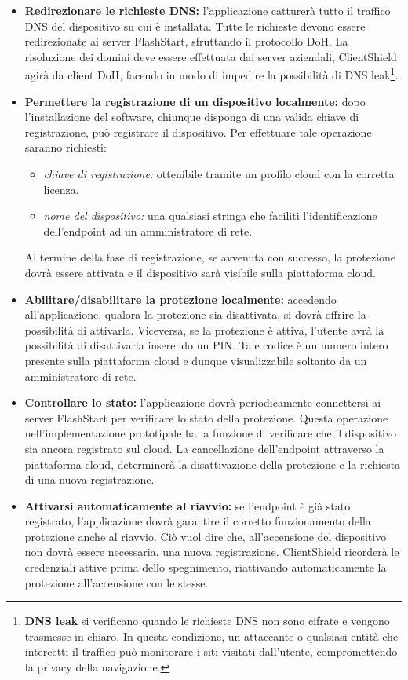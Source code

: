 \documentclass[12pt,a4paper,openright,twoside]{book}
\begin{document}
\begin{itemize}
	\item \textbf{Redirezionare le richieste \gls{DNS}:}
	l'applicazione catturerà tutto il traffico \gls{DNS} del dispositivo su cui è installata.
	Tutte le richieste devono essere redirezionate ai server FlashStart, sfruttando il protocollo \gls{DoH}.
	La risoluzione dei domini deve essere effettuata dai server aziendali, ClientShield agirà da client \gls{DoH}, facendo in modo di impedire la possibilità di \gls{DNS} leak\footnote{\textbf{DNS leak} si verificano quando le richieste \gls{DNS} non sono cifrate e vengono trasmesse in chiaro.  
		In questa condizione, un attaccante o qualsiasi entità che intercetti il traffico può monitorare i siti visitati dall'utente, compromettendo la privacy della navigazione.}.

	
	\item \textbf{Permettere la registrazione di un dispositivo localmente:}
	dopo l'installazione del software, chiunque disponga di una valida chiave di registrazione, può registrare il dispositivo.
	Per effettuare tale operazione saranno richiesti:
	\begin{itemize}
		\item \textit{chiave di registrazione:} ottenibile tramite un profilo cloud con la corretta licenza.
		\item \textit{nome del dispositivo:} una qualsiasi stringa che faciliti l'identificazione dell'endpoint ad un amministratore di rete.
	\end{itemize}
	Al termine della fase di registrazione, se avvenuta con successo, la protezione dovrà essere attivata e il dispositivo sarà visibile sulla piattaforma cloud.
	
	
	\item \textbf{Abilitare/disabilitare la protezione localmente:}
	accedendo all'applicazione, qualora la protezione sia disattivata, si dovrà offrire la possibilità di attivarla.
	Viceversa, se la protezione è attiva, l'utente avrà la possibilità di disattivarla inserendo un PIN.
	Tale codice è un numero intero presente sulla piattaforma cloud e dunque visualizzabile soltanto da un amministratore di rete.
	
	\item \textbf{Controllare lo stato:}
	l'applicazione dovrà periodicamente connettersi ai server FlashStart per verificare lo stato della protezione.
	Questa operazione nell'implementazione prototipale ha la funzione di verificare che il dispositivo sia ancora registrato sul cloud.
	La cancellazione dell'endpoint attraverso la piattaforma cloud, determinerà la disattivazione della protezione e la richiesta di una nuova registrazione.
	
	\item \textbf{Attivarsi automaticamente al riavvio:}
	se l'endpoint è già stato registrato, l'applicazione dovrà garantire il corretto funzionamento della protezione anche al riavvio.
	Ciò vuol dire che, all'accensione del dispositivo non dovrà essere necessaria, una nuova registrazione.
	ClientShield ricorderà le credenziali attive prima dello spegnimento, riattivando automaticamente la protezione all'accensione con le stesse.
	
\end{itemize}
\end{document}
